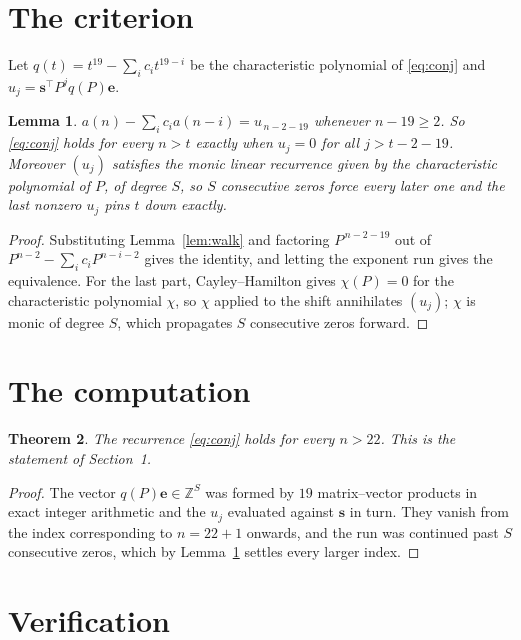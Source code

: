\documentclass[11pt,a4paper]{article}
\theoremstyle{plain}
\newtheorem{theorem}{Theorem}
\newtheorem{lemma}[theorem]{Lemma}
\theoremstyle{definition}
\begin{document}
\section{The criterion}

Let $q(t)=t^{19}-\sum_i c_i t^{19-i}$ be the characteristic polynomial of
\eqref{eq:conj} and $u_j=\mathbf{s}^{\!\top}P^{j}q(P)\mathbf{e}$.

\begin{lemma}\label{lem:crit}
$a(n)-\sum_i c_i a(n-i)=u_{\,n-2-19}$ whenever $n-19\ge2$. So \eqref{eq:conj}
holds for every $n>t$ exactly when $u_j=0$ for all $j>t-2-19$. Moreover $(u_j)$
satisfies the monic linear recurrence given by the characteristic polynomial of $P$, of
degree $S$, so $S$ consecutive zeros force every later one and the last nonzero $u_j$ pins
$t$ down exactly.
\end{lemma}

\begin{proof}
Substituting Lemma~\ref{lem:walk} and factoring $P^{\,n-2-19}$ out of
$P^{n-2}-\sum_i c_i P^{n-i-2}$ gives the identity, and letting the exponent run gives the
equivalence. For the last part, Cayley--Hamilton gives $\chi(P)=0$ for the characteristic
polynomial $\chi$, so $\chi$ applied to the shift annihilates $(u_j)$; $\chi$ is monic of
degree $S$, which propagates $S$ consecutive zeros forward.
\end{proof}

\section{The computation}

\begin{theorem}
The recurrence \eqref{eq:conj} holds for every $n>22$. This is the statement of
Section~1.
\end{theorem}

\begin{proof}
The vector $q(P)\mathbf{e}\in\mathbb{Z}^{S}$ was formed by $19$ matrix--vector
products in exact integer arithmetic and the $u_j$ evaluated against $\mathbf{s}$ in turn.
They vanish from the index corresponding to $n=22+1$ onwards, and the run was continued
past $S$ consecutive zeros, which by Lemma~\ref{lem:crit} settles every larger index.
\end{proof}

\section{Verification}
\end{document}
